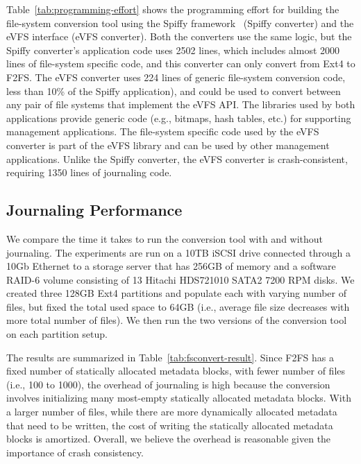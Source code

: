Table~\ref{tab:programming-effort} shows the programming effort for building the file-system conversion tool using the Spiffy framework~\cite{sun2018spiffy} (Spiffy converter) and the eVFS interface (eVFS converter). Both the converters use the same logic, but the Spiffy converter's application code uses 2502 lines, which includes almost 2000 lines of file-system specific code, and this converter can only convert from Ext4 to F2FS. The eVFS converter uses 224 lines of generic file-system conversion code, less than 10\% of the Spiffy application), and could be used to convert between any pair of file systems that implement the eVFS API. The libraries used by both applications provide generic code (e.g., bitmaps, hash tables, etc.) for supporting management applications. The file-system specific code used by the eVFS converter is part of the eVFS library and can be used by other management applications. Unlike the Spiffy converter, the eVFS converter is crash-consistent, requiring 1350 lines of journaling code.
  
\subsection{\label{tab:journal-performance}Journaling Performance}

We compare the time it takes to run the conversion tool with and without journaling. The experiments are run on a 10TB iSCSI drive connected through a 10Gb Ethernet to a storage server that has 256GB of memory and a software RAID-6 volume consisting of 13 Hitachi HDS721010 SATA2 7200 RPM disks. We created three 128GB Ext4 partitions and populate each with varying number of files, but fixed the total used space to 64GB (i.e., average file size decreases with more total number of files). We then run the two versions of the conversion tool on each partition setup.

The results are summarized in Table~\ref{tab:fsconvert-result}. Since F2FS has a fixed number of statically allocated metadata blocks, with fewer number of files (i.e., 100 to 1000), the overhead of journaling is high because the conversion involves initializing many most-empty statically allocated metadata blocks. With a larger number of files, while there are more dynamically allocated metadata that need to be written, the cost of writing the statically allocated metadata blocks is amortized. Overall, we believe the overhead is reasonable given the importance of crash consistency.

